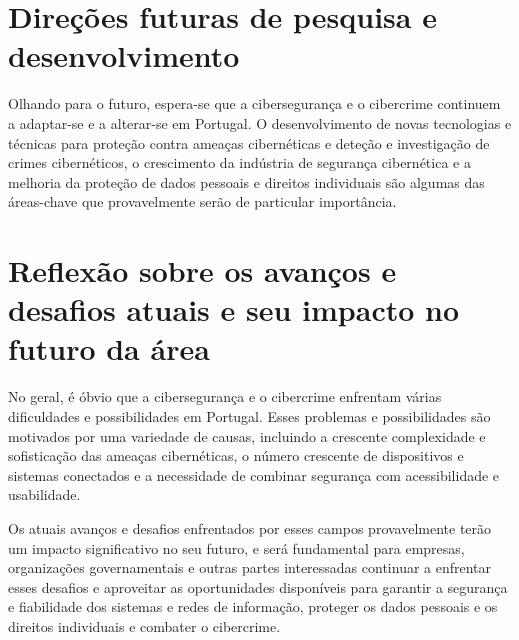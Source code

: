 \section{Direções futuras de pesquisa e desenvolvimento}

Olhando para o futuro, espera-se que a cibersegurança e o cibercrime continuem a adaptar-se e a alterar-se em Portugal. O desenvolvimento de novas tecnologias e técnicas para proteção contra ameaças cibernéticas e deteção e investigação de crimes cibernéticos, o crescimento da indústria de segurança cibernética e a melhoria da proteção de dados pessoais e direitos individuais são algumas das áreas-chave que provavelmente serão de particular importância.

\section{Reflexão sobre os avanços e desafios atuais e seu impacto no futuro da área}

No geral, é óbvio que a cibersegurança e o cibercrime enfrentam várias dificuldades e possibilidades em Portugal. Esses problemas e possibilidades são motivados por uma variedade de causas, incluindo a crescente complexidade e sofisticação das ameaças cibernéticas, o número crescente de dispositivos e sistemas conectados e a necessidade de combinar segurança com acessibilidade e usabilidade.

Os atuais avanços e desafios enfrentados por esses campos provavelmente terão um impacto significativo no seu futuro, e será fundamental para empresas, organizações governamentais e outras partes interessadas continuar a enfrentar esses desafios e aproveitar as oportunidades disponíveis para garantir a segurança e fiabilidade dos sistemas e redes de informação, proteger os dados pessoais e os direitos individuais e combater o cibercrime.

